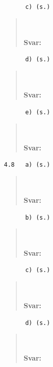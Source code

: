 \documentclass[a4paper]{article}
\newcommand{\tskcol}[1]{\textcolor{tskcol}{#1}}
\begin{document}
	\texttt{\tskcol{~~~~~~c) (s.)}}
	\begin{quotation}
		\noindent
		\\ \\
		\textbf{Svar:} 
	\end{quotation}
	
	\texttt{\tskcol{~~~~~~d) (s.)}}
	\begin{quotation}
		\noindent
		\\ \\
		\textbf{Svar:} 
	\end{quotation}
	
	\texttt{\tskcol{~~~~~~e) (s.)}}
	\begin{quotation}
		\noindent
		\\ \\
		\textbf{Svar:} 
	\end{quotation}
	
	\texttt{\tskcol{4.8~~~a) (s.)}}
	\begin{quotation}
		\noindent
		\\ \\
		\textbf{Svar:} 
	\end{quotation}
	
	\texttt{\tskcol{~~~~~~b) (s.)}}
	\begin{quotation}
		\noindent
		\\ \\
		\textbf{Svar:} 
	\end{quotation}
	
	\texttt{\tskcol{~~~~~~c) (s.)}}
	\begin{quotation}
		\noindent
		\\ \\
		\textbf{Svar:} 
	\end{quotation}
	
	\texttt{\tskcol{~~~~~~d) (s.)}}
	\begin{quotation}
		\noindent
		\\ \\
		\textbf{Svar:} 
	\end{quotation}
	
\end{document}
